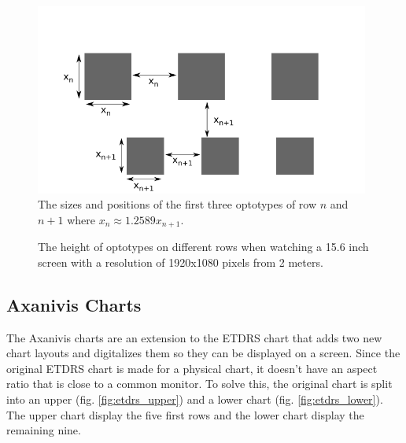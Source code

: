 \documentclass[12pt,a4paper,notitlepage]{report}
\begin{document}
\begin{figure}[ht!]
\centering
\includegraphics[width=110mm]{images/etdrs_chart_sizes.png}
\caption{The sizes and positions of the first three optotypes of row $n$ and $n+1$ where $x_n \approx 1.2589 x_{n+1}$. \label{fig:etdrs_chart_sizes}}
\end{figure} 

\begin{figure}[ht!]
\caption{The height of optotypes on different rows when watching a 15.6 inch screen with a resolution of 1920x1080 pixels from 2 meters. \label{fig:chart_size_plot}}
\end{figure}

\subsection{Axanivis Charts}
The Axanivis charts are an extension to the ETDRS chart that adds two new chart layouts and digitalizes them so they can be displayed on a screen. Since the original ETDRS chart is made for a physical chart, it doesn't have an aspect ratio \cite{Ferris} that is close to a common monitor. To solve this, the original chart is split into an upper (fig. \ref{fig:etdrs_upper}) and a lower chart (fig. \ref{fig:etdrs_lower}). The upper chart display the five first rows and the lower chart display the remaining nine.
\end{document}
